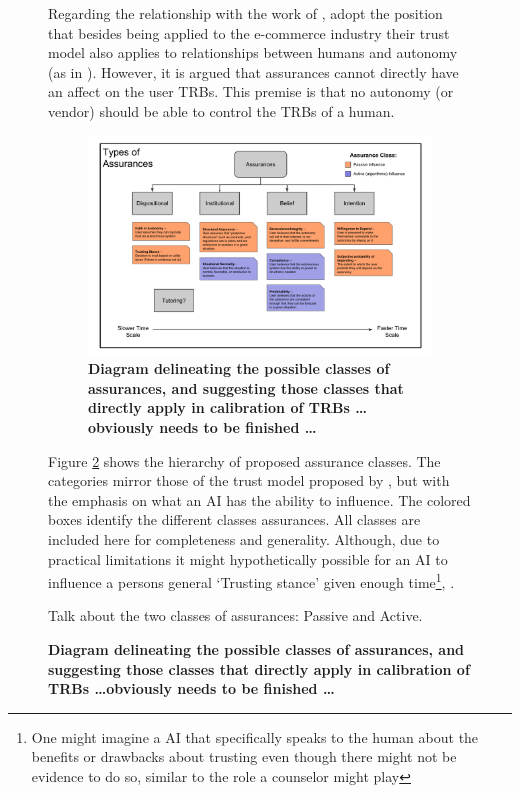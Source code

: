 \begin{figure}[htbp]
    Regarding the relationship with the work of \citet{McKnight2001-fa}, adopt the position that besides being applied to the e-commerce industry their trust model also applies to relationships between humans and autonomy (as in \citet{Lillard2016-yg}). However, it is argued that assurances cannot directly have an affect on the user TRBs. This premise is that no autonomy (or vendor) should be able to control the TRBs of a human.

	\begin{figure}
        \includegraphics[width=8in]{Figures/Assurances.pdf}%
    	\caption{\textbf{Diagram delineating the possible classes of assurances, and suggesting those classes that directly apply in calibration of TRBs \ldots obviously needs to be finished \ldots}}
        \label{fig:Assurance_classes}
    \end{figure}

    Figure \ref{fig:Assurance_classes} shows the hierarchy of proposed assurance classes. The categories mirror those of the trust model proposed by \citet{McKnight2001-fa}, but with the emphasis on what an AI has the ability to influence. The colored boxes identify the different classes assurances. All classes are included here for completeness and generality. Although, due to practical limitations it might hypothetically possible for an AI to influence a persons general `Trusting stance' given enough time\footnote{One might imagine a AI that specifically speaks to the human about the benefits or drawbacks about trusting even though there might not be evidence to do so, similar to the role a counselor might play}, .

    Talk about the two classes of assurances: Passive and Active.


\end{figure}
